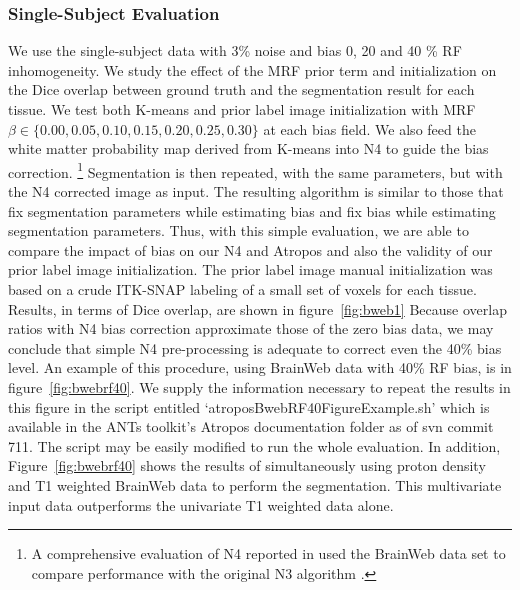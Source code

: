\documentclass[11pt,english]{article}
\begin{document}
\subsubsection{Single-Subject Evaluation} We use the single-subject
data with 3\% noise and bias 0, 20 and 40 \% RF inhomogeneity.  We
study the effect of the MRF prior term and initialization on
the Dice overlap between ground truth and the segmentation result for
each tissue.  We test both K-means and prior label image
initialization with MRF $\beta \in \{ 0.00 , 0.05 , 0.10 , 0.15 , 0.20, 
0.25 , 0.30 \}$ at each bias field.  We also feed the white matter
probability map derived from K-means into N4 to guide the bias
correction.%
\footnote{
A comprehensive evaluation of N4 reported in \cite{Tustison2010} used the BrainWeb data set
to compare performance with the original N3 algorithm \cite{Sled1998}.
}
Segmentation is then repeated, with the same parameters,
but with the N4 corrected image as input.  The resulting algorithm is
similar to those that fix segmentation parameters while
estimating bias and fix bias while estimating segmentation parameters.
Thus, with this simple evaluation, we are able to compare the impact
of bias on our N4 and Atropos and also the validity of our
prior label image initialization.  The prior label image manual
initialization was based on a crude ITK-SNAP labeling of a small
set of voxels for each tissue.  Results, in terms of
Dice overlap, are shown in figure~\ref{fig:bweb1}  Because overlap
ratios with N4 bias correction approximate those of the zero bias data, we may
conclude that simple N4 pre-processing is adequate to correct even the 40\%
bias level.  An example of this procedure, using BrainWeb data with 40\% RF bias,
is in figure~\ref{fig:bwebrf40}.  We supply the information necessary
to repeat the results in this figure in the script entitled
`{\ttfamily atroposBwebRF40FigureExample.sh}' which is available in
the ANTs toolkit's Atropos documentation folder as of svn commit 711.
The script may be easily modified to run the whole evaluation.  In
addition, Figure~\ref{fig:bwebrf40} shows the results of simultaneously using proton density
and T1 weighted BrainWeb data to perform the segmentation.  This
multivariate input data outperforms the univariate T1 weighted data
alone. 
\end{document}
